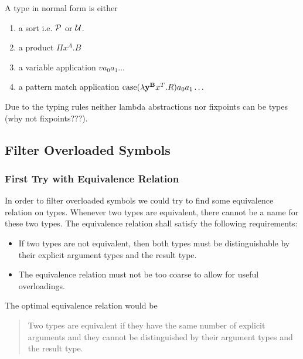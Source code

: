 A type in normal form is either
\begin{enumerate}

\item a sort i.e. ${\cal{P}}$ or ${\cal{U}}$.

\item a product $\Pi x^A. B$

\item a variable application $v a_0 a_1 \ldots$

\item a pattern match application
    $\text{case}(\lambda \mathbf{y}^{\mathbf{B}} x^T. R) a_0 a_1 \ldots$
\end{enumerate}
%
Due to the typing rules neither lambda abstractions nor fixpoints can be types
(why not fixpoints???).





\subsection{Filter Overloaded Symbols}

\subsubsection{First Try with Equivalence Relation}

In order to filter overloaded symbols we could try to find some equivalence
relation on types. Whenever two types are equivalent, there cannot be a name for
these two types. The equivalence relation shall satisfy the following
requirements:

\begin{itemize}

\item If two types are not equivalent, then both types must be distinguishable
by their explicit argument types and the result type.

\item The equivalence relation must not be too coarse to allow for useful
overloadings.

\end{itemize}

The optimal equivalence relation would be

\begin{quote}
    Two types are equivalent if they have the same number of explicit arguments
    and they cannot be distinguished by their argument types and the result
    type.
\end{quote}

